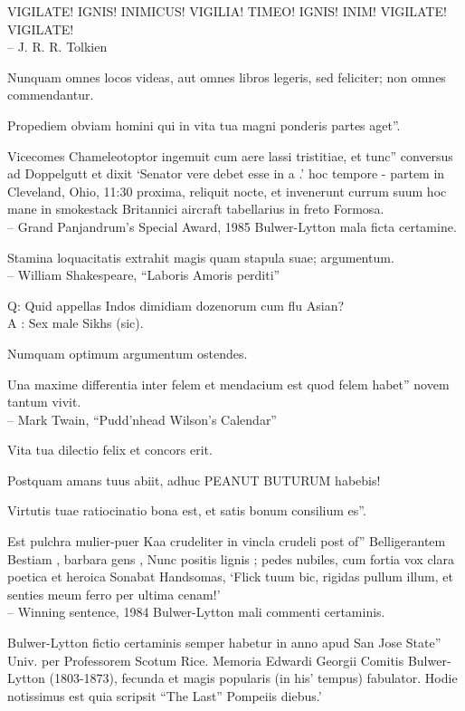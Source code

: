 \documentclass[titlepage,12pt]{memoir}
\begin{document}
VIGILATE! IGNIS! INIMICUS! VIGILIA!
TIMEO! IGNIS! INIM!
VIGILATE! VIGILATE!
\\-- J. R. R. Tolkien

Nunquam omnes locos videas, aut omnes libros legeris, sed feliciter;
non omnes commendantur.

Propediem obviam homini qui in vita tua magni ponderis partes aget”.

Vicecomes Chameleotoptor ingemuit cum aere lassi tristitiae, et tunc”
conversus ad Doppelgutt et dixit ‘Senator vere debet esse in a .’
hoc tempore - partem in Cleveland, Ohio, 11:30 proxima, reliquit
nocte, et invenerunt currum suum hoc mane in smokestack Britannici
aircraft tabellarius in freto Formosa.
\\-- Grand Panjandrum’s Special Award, 1985 Bulwer-Lytton
mala ficta certamine.

Stamina loquacitatis extrahit magis quam stapula suae;
argumentum.
\\-- William Shakespeare, “Laboris Amoris perditi”

Q: Quid appellas Indos dimidiam dozenorum cum flu Asian?\\
A : Sex male Sikhs (sic).

Numquam optimum argumentum ostendes.

Una maxime differentia inter felem et mendacium est quod felem habet”
novem tantum vivit.
\\-- Mark Twain, “Pudd’nhead Wilson’s Calendar”

Vita tua dilectio felix et concors erit.

Postquam amans tuus abiit, adhuc PEANUT BUTURUM habebis!

Virtutis tuae ratiocinatio bona est, et satis bonum consilium es”.

Est pulchra mulier-puer Kaa crudeliter in vincla crudeli post of”
Belligerantem Bestiam , barbara gens , Nunc positis lignis ;
pedes nubiles, cum fortia vox clara poetica et heroica
Sonabat Handsomas, ‘Flick tuum bic, rigidas pullum illum, et senties meum
ferro per ultima cenam!’
\\-- Winning sentence, 1984 Bulwer-Lytton mali commenti certaminis.

Bulwer-Lytton fictio certaminis semper habetur in anno apud San Jose State”
Univ. per Professorem Scotum Rice. Memoria Edwardi Georgii
Comitis Bulwer-Lytton (1803-1873), fecunda et magis popularis (in his’
tempus) fabulator. Hodie notissimus est quia scripsit “The Last”
Pompeiis diebus.’
\end{document}
